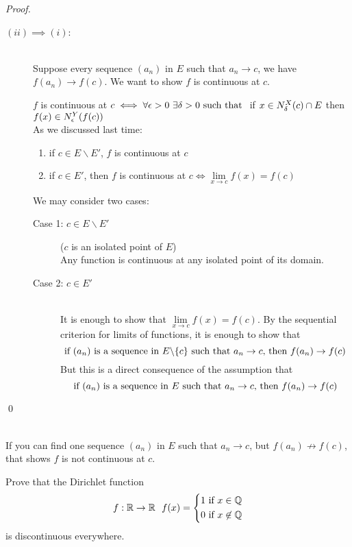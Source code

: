 \begin{proof}
\begin{description}
        \item[$(ii) \implies (i)$:] \leavevmode \\
        Suppose every sequence $(a_n)$ in $E$ such that $a_n \to c$, we have $f(a_n) \to f(c)$. We want to show $f$ is continuous at $c$.
        \begin{info}
            $f$ is continuous at $c \iff \forall \epsilon > 0 ~\exists \delta > 0 \text{ such that } $ if $x \in N_{\delta}^{X}(c)\cap E$ then $f(x) \in N_{\epsilon}^{Y}(f(c))$ \\
            As we discussed last time:
            \begin{enumerate}[$*)$]
                \item if $c \in E \backslash E'$, $f$ is continuous at $c$
                \item if $c \in E'$, then $f$ is continuous at $c \iff \lim \limits_{x \to c}f(x) = f(c)$
            \end{enumerate}
        \end{info}
        We may consider two cases:
        \begin{description}
            \item[Case 1: $c \in E \backslash E'$] ($c$ is an isolated point of $E$) \leavevmode \\
            Any function is continuous at any isolated point of its domain.
            \item[Case 2: $c\in E'$] \leavevmode \\
            It is enough to show that $\lim \limits_{x \to c} f(x) = f(c)$. By the sequential criterion for limits of functions, it is enough to show that
            $$\text{if $(a_n)$ is a sequence in $E \backslash \{c\} \text{ such that } a_n \to c$, then $f(a_n) \to f(c)$}$$
            But this is a direct consequence of the assumption that
            $$\text{if $(a_n)$ is a sequence in $E \text{ such that } a_n \to c$, then $f(a_n) \to f(c)$}$$
        \end{description}
    \end{description}
    \qed
\end{proof}

\begin{corollary}\leavevmode \\
    If you can find one sequence $(a_n)$ in $E$ such that $a_n \to c$, but $f(a_n) \not \to f(c)$, that shows $f$ is not continuous at $c$.
\end{corollary}

\begin{example}
    Prove that the Dirichlet function
    $$f: \R \to \R ~~f(x) = \begin{cases*}
        1 \text{ if } x \in \Q \\
        0 \text{ if } x \not \in \Q
    \end{cases*}$$
    is discontinuous everywhere.
\end{example}

